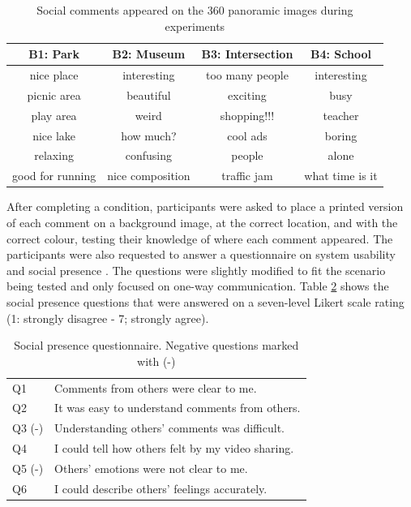 \begin{table}[h]
  \centering
  \caption{Social comments appeared on the 360 panoramic images during experiments}
  \label{table:mgia16:comment}
  \begin{tabular}{ |c|c|c|c| } 
\hline
    B1: Park    & B2: Museum  &   B3: Intersection    &  B4: School\\
\hline
    nice place  &   interesting &  too many people & interesting \\
    picnic area &   beautiful   &  exciting  & busy \\
    play area   &   weird   &  shopping!!! & teacher \\
    nice lake   &   how much?    &  cool ads    & boring \\
    relaxing    &   confusing   &  people    & alone \\
    good for running    &   nice composition    &  traffic jam & what time is it\\\hline
  \end{tabular}
\end{table}

After completing a condition, participants were asked to place a printed version of each comment on a background image, at the correct location, and with the correct colour, testing their knowledge of where each comment appeared. The participants were also requested to answer a questionnaire on system usability \cite{brooke1996sus} and social presence \cite{Harms2004}. The questions were slightly modified to fit the scenario being tested and only focused on one-way communication. Table \ref{table:social_questions} shows the social presence questions that were answered on a seven-level Likert scale rating (1: strongly disagree - 7; strongly agree). 

\begin{table}[h]
  \centering
  \caption{Social presence questionnaire. Negative questions marked with (-)}
  \label{table:social_questions}
  \begin{tabular}{ll}
    Q1 & Comments from others were clear to me.          \\
    Q2 & It was easy to understand comments from others. \\
    Q3 (-) & Understanding others' comments was difficult.  \\
    Q4 & I could tell how others felt by my video sharing.\\
    Q5 (-) & Others' emotions were not clear to me.\\
    Q6 & I could describe others' feelings accurately.
  \end{tabular}
\end{table}

